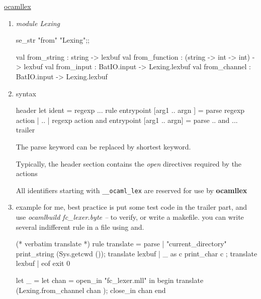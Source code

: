 
\href{http://caml.inria.fr/pub/docs/manual-ocaml/manual026.html}{ocamllex}

\begin{enumerate}
\item \textit{module Lexing}
  \begin{redcode}
    se_str "from" "Lexing";;
  \end{redcode}
  
\begin{bluecode}  
  val from_string : string -> lexbuf
  val from_function : (string -> int -> int) -> lexbuf
  val from_input : BatIO.input -> Lexing.lexbuf
  val from_channel : BatIO.input -> Lexing.lexbuf    
\end{bluecode}

\item syntax \\

  \begin{bluetext}
    {header}
    let ident = regexp ...
    rule entrypoint [arg1 .. argn ] =
       parse regexp {action }
       | ..
       | regexp {action}
    and entrypoint [arg1 .. argn] =
       parse ..
    and ... 
    {trailer}
  \end{bluetext}

  The parse keyword can be replaced by shortest keyword.

  Typically, the header section contains the \textit{open} directives
  required by the actions

  All identifiers starting with \verb|__ocaml_lex| are reserved for use by
  \textbf{ocamllex}
\item example
  for me, best practice is put some test code in the trailer part, and
  use \textit{ocamlbuild fc\_lexer.byte --} to verify, or write a
  makefile. you can write several indifferent rule in a file using and.

  \begin{bluetext}

(* verbatim translate *)
rule translate = parse 
  | "current_directory" {print_string (Sys.getcwd ()); translate lexbuf}
  | _ as c {print_char c ; translate lexbuf}
  | eof {exit 0}

{
  let _ = 
    let chan = open_in "fc_lexer.mll" in begin
    translate (Lexing.from_channel chan ); 
    close_in chan 
    end 

}
    
\end{bluetext}


\end{enumerate}
